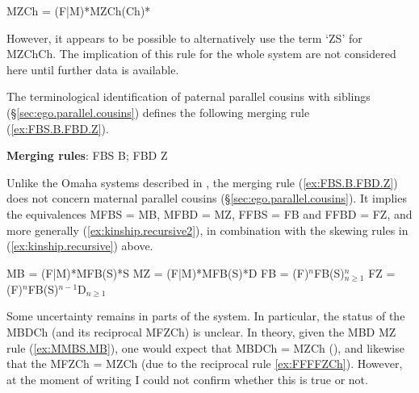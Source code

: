  \begin{exe}
\ex \label{ex:MMMMMZChChChCh}
\glt MZCh = (F|M)*MZCh(Ch)*
\end{exe}

However, it appears to be possible to alternatively use the term  `ZS' for MZChCh. The implication of this rule for the whole system are not considered here until further data is available.

The terminological identification of paternal parallel cousins with siblings (§\ref{sec:ego.parallel.cousins}) defines the following merging rule (\ref{ex:FBS.B.FBD.Z}).

\begin{exe}
\ex \label{ex:FBS.B.FBD.Z}
\glt \textbf{Merging rules}: FBS \fl{} B; FBD \fl{} Z
\end{exe}

Unlike the Omaha systems described in \citet[360]{lounsbury64crow}, the merging rule (\ref{ex:FBS.B.FBD.Z}) does not concern maternal parallel cousins (§\ref{sec:ego.parallel.cousins}). It implies the equivalences MFBS = MB, MFBD = MZ, FFBS = FB and FFBD = FZ, and more generally (\ref{ex:kinship.recursive2}), in combination with the skewing rules in (\ref{ex:kinship.recursive}) above.

 \begin{exe}
 \ex \label{ex:kinship.recursive2}
\begin{xlist}
\ex  
\glt MB = (F|M)*MFB(S)*S
\ex  
\glt MZ = (F|M)*MFB(S)*D
\ex  
\glt FB = (F)$^n$FB(S)$^n_{n\geqslant 1}$
\ex  
\glt FZ = (F)$^n$FB(S)$^{n-1}$D$_{n\geqslant 1}$
\end{xlist}
\end{exe}

Some uncertainty remains in parts of the system. In particular, the status of the MBDCh (and its reciprocal MFZCh) is unclear. In theory, given the MBD \fl{} MZ rule (\ref{ex:MMBS.MB}), one would expect that MBDCh = MZCh (), and likewise that the MFZCh = MZCh (due to the reciprocal rule \ref{ex:FFFFZCh}). However, at the moment of writing I could not confirm whether this is true or not.
 
% 
% 

